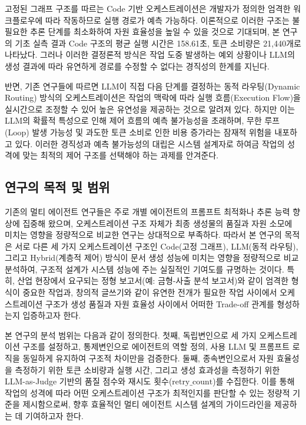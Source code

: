 \documentclass[10pt,twocolumn]{article}
\begin{document}
고정된 그래프 구조를 따르는 Code 기반 오케스트레이션은 개발자가 정의한 엄격한 워크플로우에 따라 작동하므로 실행 경로가 예측 가능하다. 이론적으로 이러한 구조는 불필요한 추론 단계를 최소화하여 자원 효율성을 높일 수 있을 것으로 기대되며, 본 연구의 기초 실측 결과 Code 구조의 평균 실행 시간은 158.61초, 토큰 소비량은 21,440개로 나타났다. 그러나 이러한 결정론적 방식은 작업 도중 발생하는 예외 상황이나 LLM의 생성 결과에 따라 유연하게 경로를 수정할 수 없다는 경직성의 한계를 지닌다.

반면, 기존 연구들에 따르면 LLM이 직접 다음 단계를 결정하는 동적 라우팅(Dynamic Routing) 방식의 오케스트레이션은 작업의 맥락에 따라 실행 흐름(Execution Flow)을 실시간으로 조정할 수 있어 높은 유연성을 제공하는 것으로 알려져 있다. 하지만 이는 LLM의 확률적 특성으로 인해 제어 흐름의 예측 불가능성을 초래하며, 무한 루프(Loop) 발생 가능성 및 과도한 토큰 소비로 인한 비용 증가라는 잠재적 위험을 내포하고 있다. 이러한 경직성과 예측 불가능성의 대립은 시스템 설계자로 하여금 작업의 성격에 맞는 최적의 제어 구조를 선택해야 하는 과제를 안겨준다.

\subsection{연구의 목적 및 범위}

기존의 멀티 에이전트 연구들은 주로 개별 에이전트의 프롬프트 최적화나 추론 능력 향상에 집중해 왔으며, 오케스트레이션 구조 자체가 최종 생성물의 품질과 자원 소모에 미치는 영향을 정량적으로 비교한 연구는 상대적으로 부족하다. 따라서 본 연구의 목적은 서로 다른 세 가지 오케스트레이션 구조인 Code(고정 그래프), LLM(동적 라우팅), 그리고 Hybrid(계층적 제어) 방식이 문서 생성 성능에 미치는 영향을 정량적으로 비교 분석하여, 구조적 설계가 시스템 성능에 주는 실질적인 기여도를 규명하는 것이다. 특히, 산업 현장에서 요구되는 정형 보고서(예: 금형-사출 분석 보고서)와 같이 엄격한 형식이 중요한 작업과, 창의적 글쓰기와 같이 유연한 전개가 필요한 작업 사이에서 오케스트레이션 구조가 생성 품질과 자원 효율성 사이에서 어떠한 Trade-off 관계를 형성하는지 입증하고자 한다.

본 연구의 분석 범위는 다음과 같이 정의한다. 첫째, 독립변인으로 세 가지 오케스트레이션 구조를 설정하고, 통제변인으로 에이전트의 역할 정의, 사용 LLM 및 프롬프트 로직을 동일하게 유지하여 구조적 차이만을 검증한다. 둘째, 종속변인으로서 자원 효율성을 측정하기 위한 토큰 소비량과 실행 시간, 그리고 생성 효과성을 측정하기 위한 LLM-as-Judge 기반의 품질 점수와 재시도 횟수($\text{retry\_count}$)를 수집한다. 이를 통해 작업의 성격에 따라 어떤 오케스트레이션 구조가 최적인지를 판단할 수 있는 정량적 기준을 제시함으로써, 향후 효율적인 멀티 에이전트 시스템 설계의 가이드라인을 제공하는 데 기여하고자 한다.
\end{document}
